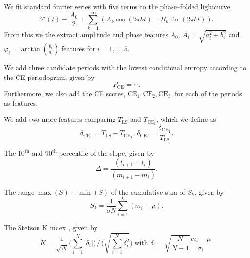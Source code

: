 \begin{enumerate}
 We fit standard fourier series with five terms to the phase--folded lightcurve.
\begin{equation}\mathcal{F}(t) = \frac{A_0}{2} + \sum_{k=1}^{\infty} ( A_k \cos(2 \pi k t) + B_k \sin(2 \pi k t) ).\end{equation}
From this we the extract amplitude and phase features $A_0$, $A_i = \sqrt{a_i^2 + b_i^2}$ and $\varphi_i = \arctan(\frac{b_i}{a_i})$ features for $i = 1, \ldots, 5$.

 We add three candidate periods with the lowest conditional entropy according to the CE periodogram, given by
\begin{equation}P_{\text{CE}} = \cdots.\end{equation}
Furthermore, we also add the CE scores, $\text{CE}_1, \text{CE}_2, \text{CE}_3$, for each of the periods as features.

 We add two more features comparing $T_{\text{LS}}$ and $T_{\text{CE}_1}$, which we define as
\begin{equation}\delta_{\text{CE}_1} = T_{\text{LS}} - T_{\text{CE}_1}, \, \delta_{\text{CE}_2} = \frac{\delta_{\text{CE}_1}}{T_{\text{LS}}}.\end{equation}

 The $10^\text{th}$ and $90^\text{th}$ percentile of the slope, given by
\begin{equation}\Delta = \frac{(t_{i+1} - t_i)}{(m_{i+1} - m_i)}.\end{equation}

 The range $\max(S) - \min(S)$ of the cumulative sum \citep{ellaway1978} of $S_k$, given by
\begin{equation}S_k = \frac{1}{\sigma N} \sum\limits_{i=1}^k (m_i - \mu) .\end{equation}

 The Stetson K index \citep{stetson1996}, given by
\begin{equation}K = \frac{1}{\sqrt{N}} \big( \sum\limits_{i=1}^N |\delta_i| \big) \, / \, \big( \sqrt{\sum\limits_{i=1}^N \delta_i^2} \big) \text{ with } \delta_i = \sqrt{\frac{N}{N-1}} \frac{m_i - \mu}{\sigma_i}.\end{equation}


\end{enumerate}


